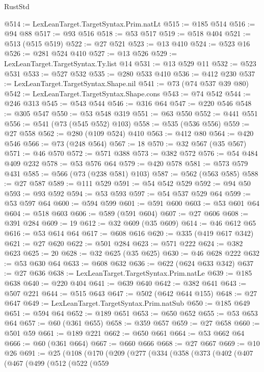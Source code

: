 \begin{lexlean}{RustStd}
\begin{coremodule}
@514 := LexLeanTarget.TargetSyntax.Prim.natLt
@515 := @185 @514
@516 := @94 @88
@517 := @93 @516
@518 := @53 @517
@519 := @518 @404
@521 := @513 (@515 @519)
@522 := @27 @521
@523 := @13 @410
@524 := @523 @16
@526 := @281 @524 @410
@527 := @13 @526
@529 := LexLeanTarget.TargetSyntax.Ty.list @14
@531 := @13 @529 @11
@532 := @523 @531
@533 := @527 @532
@535 := @280 @533 @410
@536 := @412 @230
@537 := LexLeanTarget.TargetSyntax.Shape.nil
@541 := @73 (@74 @537 @39 @80)
@542 := LexLeanTarget.TargetSyntax.Shape.cons
@543 := @74 @542
@544 := @246 @313
@545 := @543 @544
@546 := @316 @64
@547 := @220 @546
@548 := @305 @547
@550 := @53 @548 @319
@551 := @63 @550
@552 := @441 @551
@556 := @541 (@73 (@545 @552) @103)
@558 := @535 (@536 @556)
@559 := @27 @558
@562 := @280 (@109 @524) @410
@563 := @412 @80
@564 := @420 @546
@566 := @73 (@248 @564)
@567 := 18
@570 := @32 @567 (@35 @567)
@571 := @46 @570
@572 := @571 @388
@573 := @382 @572
@576 := @54 @484 @409 @232
@578 := @53 @576 @64
@579 := @420 @578
@581 := @573 @579 @431
@585 := @566 (@73 (@238 @581) @103)
@587 := @562 (@563 @585)
@588 := @27 @587
@589 := @111 @529
@591 := @54 @542 @529
@592 := @94 @50
@593 := @93 @592
@594 := @53 @593
@597 := @54 @537 @529 @64
@599 := @53 @597 @64
@600 := @594 @599
@601 := @591 @600
@603 := @53 @601 @64
@604 := @518 @603
@606 := @589 (@591 @604)
@607 := @27 @606
@608 := @391 @284
@609 := 19
@612 := @32 @609 (@35 @609)
@614 := @46 @612 @65
@616 := @53 @614 @64
@617 := @608 @616
@620 := @335 (@419 @617 @342)
@621 := @27 @620
@622 := @501 @284
@623 := @571 @222
@624 := @382 @623
@625 := 20
@628 := @32 @625 (@35 @625)
@630 := @46 @628 @222
@632 := @53 @630 @64
@633 := @608 @632
@636 := @622 (@624 @633 @342)
@637 := @27 @636
@638 := LexLeanTarget.TargetSyntax.Prim.natLe
@639 := @185 @638
@640 := @220 @404
@641 := @639 @640
@642 := @382 @641
@643 := @507 @221
@644 := @515 @643
@647 := @502 (@642 @644 @155)
@648 := @27 @647
@649 := LexLeanTarget.TargetSyntax.Prim.natSub
@650 := @185 @649
@651 := @594 @64
@652 := @189 @651
@653 := @650 @652
@655 := @53 @653 @64
@657 := @60 (@361 @655)
@658 := @359 @657
@659 := @27 @658
@660 := @501 @59
@661 := @189 @221
@662 := @650 @661
@664 := @53 @662 @64
@666 := @60 (@361 @664)
@667 := @660 @666
@668 := @27 @667
@669 := @10 @26
@691 := @25
    (@108
      (@170
        (@209
          (@277
            (@334
              (@358
                (@373
                  (@402
                    (@407
                      (@467
                        (@499
                          (@512
                            (@522
                              (@559

\end{coremodule}
\end{lexlean}
